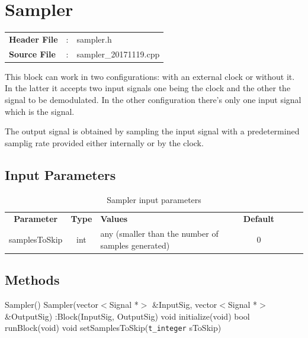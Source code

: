 \clearpage

\section{Sampler}

\begin{tcolorbox}	
	\begin{tabular}{p{2.75cm} p{0.2cm} p{10.5cm}} 	
		\textbf{Header File}   &:& sampler.h \\
		\textbf{Source File}   &:& sampler\_20171119.cpp \\
	\end{tabular}
\end{tcolorbox}

This block can work in two configurations: with an external clock or without it. In the latter it accepts two input signals one being the clock and the other the signal to be demodulated. In the other configuration there's only one input signal which is the signal. 

The output signal is obtained by sampling the input signal with a predetermined samplig rate provided either internally or by the clock.

\subsection*{Input Parameters}

\begin{table}[h]
	\centering
	\begin{tabular}{|c|c|p{60mm}|c|ccp{60mm}}
		\cline{1-4}
		\textbf{Parameter} & \textbf{Type} & \textbf{Values} &   \textbf{Default}& \\ \cline{1-4}
		samplesToSkip & int & any (smaller than the number of samples generated) & $0$ \\ \cline{1-4}
	\end{tabular}
	\caption{Sampler input parameters}
	\label{table:sampler_in_par}
\end{table}


\subsection*{Methods}
 
Sampler() {}
\bigbreak
Sampler(vector$<$Signal *$>$ \&InputSig, vector$<$Signal *$>$ \&OutputSig) :Block(InputSig, OutputSig) {}
\bigbreak
void initialize(void)
\bigbreak
bool runBlock(void)
\bigbreak
void setSamplesToSkip(\texttt{t\_integer} sToSkip)

